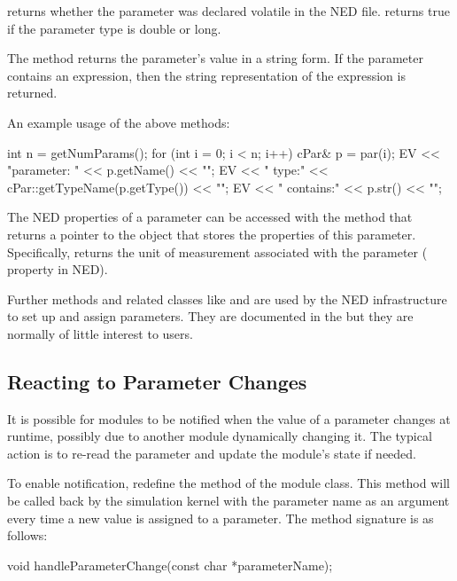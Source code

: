  returns whether the parameter was declared volatile
in the NED file.  returns true if the parameter
type is double or long.

The  method returns the parameter's value in a string form.
If the parameter contains an expression, then the string representation
of the expression is returned.

An example usage of the above methods:

\begin{cpp}
int n = getNumParams();
for (int i = 0; i < n; i++)
{
    cPar& p = par(i);
    EV << "parameter: " << p.getName() << "\n";
    EV << "  type:" << cPar::getTypeName(p.getType()) << "\n";
    EV << "  contains:" << p.str() << "\n";
}
\end{cpp}

The NED properties of a parameter can be accessed with the 
method that returns a pointer to the  object that stores
the properties of this parameter. Specifically,  returns
the unit of measurement associated with the parameter ( property in NED).

Further  methods and related classes like  and
 are used by the NED infrastructure to set up and
assign parameters. They are documented in the  but
they are normally of little interest to users.


\subsection{Reacting to Parameter Changes}
\label{sec:simple-modules:handleparameterchange}

It is possible for modules to be notified when the value of a parameter changes
at runtime, possibly due to another module dynamically changing it. The typical
action is to re-read the parameter and update the module's state if needed.

To enable notification, redefine the  method of
the module class. This method will be called back by the simulation kernel with
the parameter name as an argument every time a new value is assigned to a
parameter. The method signature is as follows:

\begin{cpp}
void handleParameterChange(const char *parameterName);
\end{cpp}

